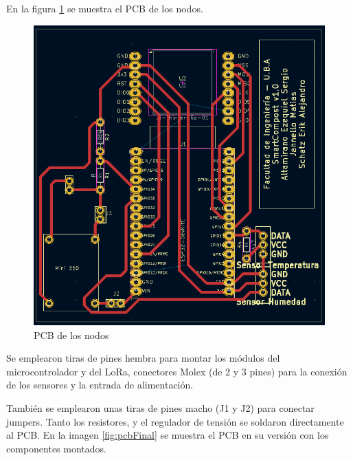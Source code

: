 En la figura \ref{fig:pcb} se muestra el PCB de los nodos.

\begin{figure}[H]
	\centering
	\includegraphics[scale=0.8]{./Figures/Hardware/PCB/pcb.png}
	\caption{PCB de los nodos}
	\label{fig:pcb}
\end{figure}



Se emplearon tiras de pines hembra para montar los módulos del microcontrolador y del LoRa, conectores Molex (de 2 y 3 pines) para la conexión de los sensores y la entrada de alimentación.

También se emplearon unas tiras de pines macho (J1 y J2) para conectar jumpers. Tanto los resistores, y el regulador de tensión se soldaron directamente al PCB.
En la imagen \ref{fig:pcbFinal} se muestra el PCB en su versión con los componentes montados.

